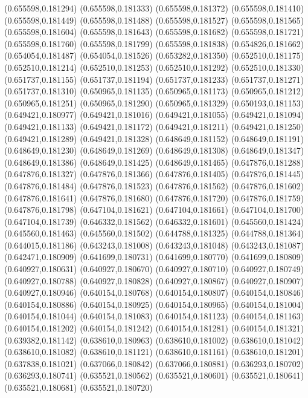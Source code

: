 (0.655598,0.181294)
(0.655598,0.181333)
(0.655598,0.181372)
(0.655598,0.181410)
(0.655598,0.181449)
(0.655598,0.181488)
(0.655598,0.181527)
(0.655598,0.181565)
(0.655598,0.181604)
(0.655598,0.181643)
(0.655598,0.181682)
(0.655598,0.181721)
(0.655598,0.181760)
(0.655598,0.181799)
(0.655598,0.181838)
(0.654826,0.181662)
(0.654054,0.181487)
(0.654054,0.181526)
(0.653282,0.181350)
(0.652510,0.181175)
(0.652510,0.181214)
(0.652510,0.181253)
(0.652510,0.181292)
(0.652510,0.181330)
(0.651737,0.181155)
(0.651737,0.181194)
(0.651737,0.181233)
(0.651737,0.181271)
(0.651737,0.181310)
(0.650965,0.181135)
(0.650965,0.181173)
(0.650965,0.181212)
(0.650965,0.181251)
(0.650965,0.181290)
(0.650965,0.181329)
(0.650193,0.181153)
(0.649421,0.180977)
(0.649421,0.181016)
(0.649421,0.181055)
(0.649421,0.181094)
(0.649421,0.181133)
(0.649421,0.181172)
(0.649421,0.181211)
(0.649421,0.181250)
(0.649421,0.181289)
(0.649421,0.181328)
(0.648649,0.181152)
(0.648649,0.181191)
(0.648649,0.181230)
(0.648649,0.181269)
(0.648649,0.181308)
(0.648649,0.181347)
(0.648649,0.181386)
(0.648649,0.181425)
(0.648649,0.181465)
(0.647876,0.181288)
(0.647876,0.181327)
(0.647876,0.181366)
(0.647876,0.181405)
(0.647876,0.181445)
(0.647876,0.181484)
(0.647876,0.181523)
(0.647876,0.181562)
(0.647876,0.181602)
(0.647876,0.181641)
(0.647876,0.181680)
(0.647876,0.181720)
(0.647876,0.181759)
(0.647876,0.181798)
(0.647104,0.181621)
(0.647104,0.181661)
(0.647104,0.181700)
(0.647104,0.181739)
(0.646332,0.181562)
(0.646332,0.181601)
(0.645560,0.181424)
(0.645560,0.181463)
(0.645560,0.181502)
(0.644788,0.181325)
(0.644788,0.181364)
(0.644015,0.181186)
(0.643243,0.181008)
(0.643243,0.181048)
(0.643243,0.181087)
(0.642471,0.180909)
(0.641699,0.180731)
(0.641699,0.180770)
(0.641699,0.180809)
(0.640927,0.180631)
(0.640927,0.180670)
(0.640927,0.180710)
(0.640927,0.180749)
(0.640927,0.180788)
(0.640927,0.180828)
(0.640927,0.180867)
(0.640927,0.180907)
(0.640927,0.180946)
(0.640154,0.180768)
(0.640154,0.180807)
(0.640154,0.180846)
(0.640154,0.180886)
(0.640154,0.180925)
(0.640154,0.180965)
(0.640154,0.181004)
(0.640154,0.181044)
(0.640154,0.181083)
(0.640154,0.181123)
(0.640154,0.181163)
(0.640154,0.181202)
(0.640154,0.181242)
(0.640154,0.181281)
(0.640154,0.181321)
(0.639382,0.181142)
(0.638610,0.180963)
(0.638610,0.181002)
(0.638610,0.181042)
(0.638610,0.181082)
(0.638610,0.181121)
(0.638610,0.181161)
(0.638610,0.181201)
(0.637838,0.181021)
(0.637066,0.180842)
(0.637066,0.180881)
(0.636293,0.180702)
(0.636293,0.180741)
(0.635521,0.180562)
(0.635521,0.180601)
(0.635521,0.180641)
(0.635521,0.180681)
(0.635521,0.180720)
